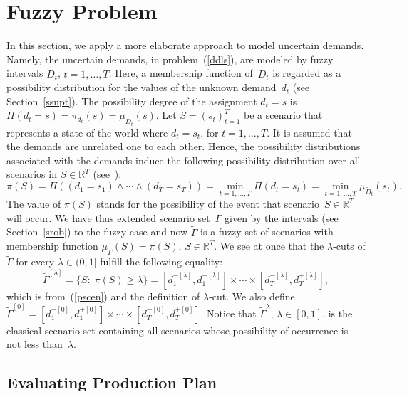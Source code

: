\documentclass[11pt]{article}
\newcommand{\Rset}{\mathbb{R}}
\begin{document}
\section{Fuzzy Problem}
\label{sfp}

In this section, we apply a more elaborate approach to model 
uncertain demands. 
Namely, 
the  uncertain demands, in problem~(\ref{ddls}), are
modeled by fuzzy intervals $\widetilde{D}_t$, $t=1,\ldots,T$.
Here,
a membership function of~$\widetilde{D}_t$ is regarded as
a possibility distribution
for the values of the unknown demand~$d_t$ (see Section~\ref{ssnpt}).
The possibility degree of the assignment 
$d_t=s$ is
$\Pi(d_t=s)=
\pi_{d_t}(s)=\mu_{\widetilde{D}_t}(s)$.
Let $S=(s_t)_{t=1}^T$
be a scenario that represents a  state of the world
where
$d_t=s_t$, for $t=1,\ldots,T$.
It is assumed that 
the demands are unrelated  one to each other. 
Hence,
the 
possibility distributions
 associated with the demands induce the following possibility distribution over all scenarios in $S\in \Rset^T$ (see~\cite{DFG03}):
\begin{equation}
\pi(S)=\Pi((d_1=s_1)\wedge\cdots\wedge (d_T=s_T))
 =\min_{t=1,\ldots,T}\Pi(d_t=s_t)
 =\min_{t=1,\ldots,T}\mu_{\widetilde{D}_t}(s_t).\label{pscen}
 \end{equation}
 The value of $\pi(S)$ stands for the possibility of the event that 
 scenario~$S\in \Rset^T$ will occur.
 We have thus extended scenario set~$\Gamma$ given by the intervals  
 (see Section~\ref{srob}) to the fuzzy case and now
 $\widetilde{\Gamma}$ is a fuzzy
 set of scenarios with membership function
 $\mu_{\widetilde{\Gamma}}(S)=\pi(S)$, $S\in\Rset^T$.
We see at once that the  $\lambda$-cuts of $\widetilde{\Gamma}$  for every $\lambda\in (0,1]$
fulfill the following equality:
\[
\widetilde{\Gamma}^{[\lambda]}=
\{S:\; \pi(S)\geq \lambda\}=[d^{-[\lambda]}_1,d^{+[\lambda]}_1]\times\cdots\times
 [d^{-[\lambda]}_T,d^{+[\lambda]}_T],
\]
which is from~(\ref{pscen}) and the definition of $\lambda$-cut.
We also define $\widetilde{\Gamma}^{[0]}
=[d^{-[0]}_1,d^{+[0]}_1]\times\cdots\times
 [d^{-[0]}_T,d^{+[0]}_T]$.
Notice that $\widetilde{\Gamma}^\lambda$, $\lambda \in [0,1]$, is the classical scenario set containing all scenarios whose possibility of occurrence is not less than~$\lambda$.

\subsection{Evaluating  Production Plan}
\end{document}
